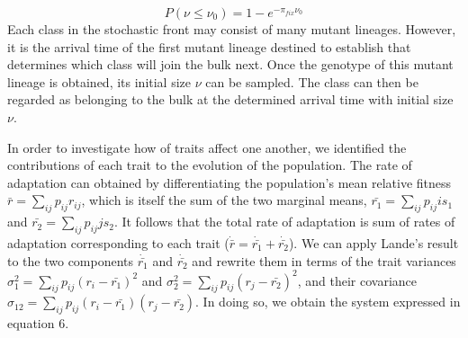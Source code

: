 \documentclass[11pt,twocolumn]{article}
\begin{document}
% 
% 
% 
% 
\begin{equation}
P(\nu \leq \nu_0) = 1- e^{-\pi_{fix} \nu_0}
\end{equation}
Each class in the stochastic front may consist of many mutant lineages. However, it is the arrival time of the first mutant lineage destined to establish that determines which class will join the bulk next. Once the genotype of this mutant lineage is obtained, its initial size $\nu$ can be sampled. The class can then be regarded as belonging to the bulk at the determined arrival time with initial size $\nu$. \par
% 
% 
% 
% 
% 
In order to investigate how of traits affect one another, we identified the contributions of each trait to the evolution of the population. The rate of adaptation can obtained by differentiating the population's mean relative fitness $\bar{r}=\sum_{ij} p_{ij} r_{ij}$, which is itself the sum of the two marginal means, $\bar{r_1}=\sum_{ij} p_{ij} is_1$ and $\bar{r_2}=\sum_{ij} p_{ij} j s_2$.  It follows that the total rate of adaptation is sum of rates of adaptation corresponding to each trait ($\dot{\bar{r}}=\dot{\bar{r_1}} +\dot{\bar{r_2}}$).  We can apply Lande's result to the two components $\dot{\bar{r_1}} $ and $\dot{\bar{r_2}} $ and rewrite them in terms of the trait variances $\sigma_1^2 = \sum_{ij} p_{ij} (r_i-\bar{r_1})^2$ and $\sigma_2^2 = \sum_{ij} p_{ij} (r_j-\bar{r_2})^2$, and their covariance $\sigma_{12} =\sum_{ij} p_{ij} (r_i-\bar{r_1})(r_j-\bar{r_2})$.  In doing so, we obtain the system expressed in equation 6.
\end{document}
